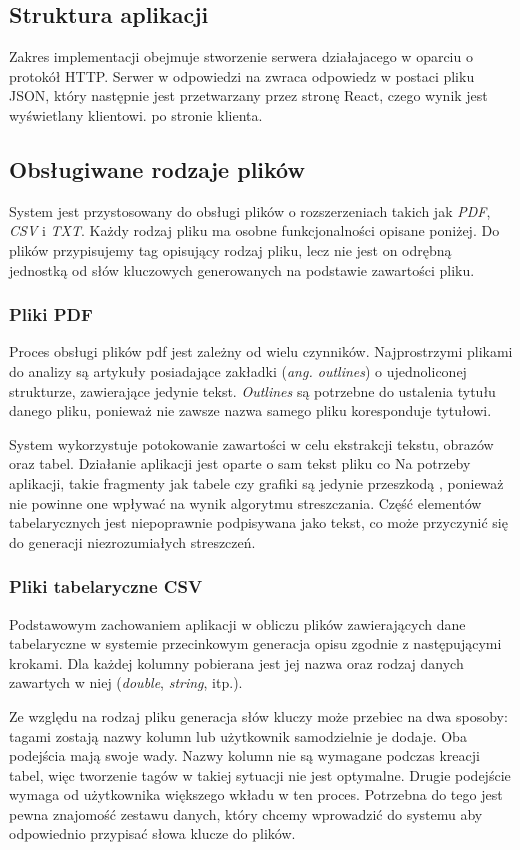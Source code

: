 \documentclass[12pt,a4paper,twoside]{article}
\begin{document}
\subsection{Struktura aplikacji}
Zakres implementacji obejmuje stworzenie serwera działajacego w oparciu o protokół HTTP. Serwer w odpowiedzi na zwraca odpowiedz w postaci pliku JSON, który następnie jest przetwarzany przez stronę React, czego wynik jest wyświetlany klientowi.
po stronie klienta.
\subsection{Obsługiwane rodzaje plików}
System jest przystosowany do obsługi plików o rozszerzeniach takich jak \textit{PDF}, \textit{CSV} i \textit{TXT}. Każdy rodzaj pliku ma osobne funkcjonalności opisane poniżej. Do plików przypisujemy tag opisujący rodzaj pliku, lecz nie jest on odrębną jednostką od słów kluczowych generowanych na podstawie zawartości pliku.
\subsubsection*{Pliki PDF}
Proces obsługi plików pdf jest zależny od wielu czynników. Najprostrzymi plikami do analizy są artykuły posiadające zakładki (\textit{ang. outlines}) o ujednoliconej strukturze, zawierające jedynie tekst. \textit{Outlines} są potrzebne do ustalenia tytułu danego pliku, ponieważ nie zawsze nazwa samego pliku koresponduje tytułowi.\par
System wykorzystuje potokowanie zawartości w celu ekstrakcji tekstu, obrazów oraz tabel. Działanie aplikacji jest oparte o sam tekst pliku co Na potrzeby aplikacji, takie fragmenty jak tabele czy grafiki są jedynie przeszkodą , ponieważ nie powinne one wpływać na wynik algorytmu streszczania. Część elementów tabelarycznych jest niepoprawnie podpisywana jako tekst, co może przyczynić się do generacji niezrozumiałych streszczeń. 
\subsubsection*{Pliki tabelaryczne CSV}
Podstawowym zachowaniem aplikacji w obliczu plików zawierających dane tabelaryczne w systemie przecinkowym generacja opisu zgodnie z następującymi krokami. Dla każdej kolumny pobierana jest jej nazwa oraz rodzaj danych zawartych w niej (\textit{double}, \textit{string}, itp.). \par
Ze względu na rodzaj pliku generacja słów kluczy może przebiec na dwa sposoby: tagami zostają nazwy kolumn lub użytkownik samodzielnie je dodaje. Oba podejścia mają swoje wady. Nazwy kolumn nie są wymagane podczas kreacji tabel, więc tworzenie tagów w takiej sytuacji nie jest optymalne. Drugie podejście wymaga od użytkownika większego wkładu w ten proces. Potrzebna do tego jest pewna znajomość zestawu danych, który chcemy wprowadzić do systemu aby odpowiednio przypisać słowa klucze do plików.
\end{document}
